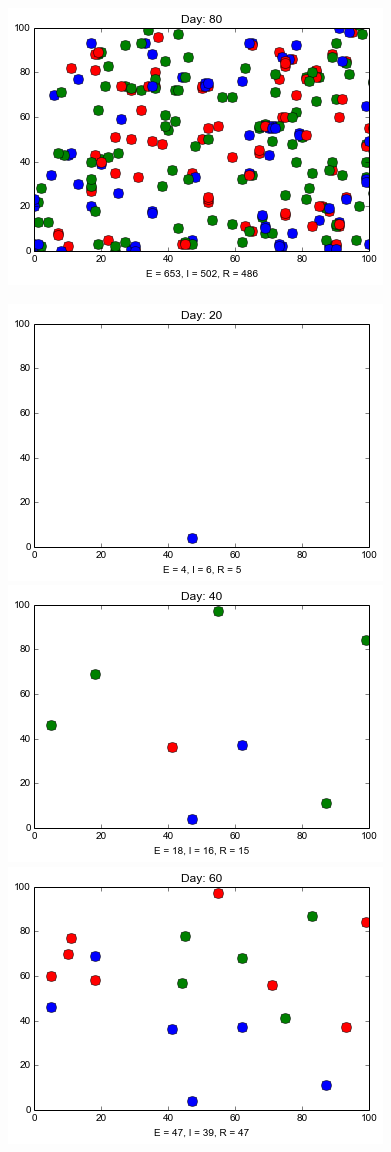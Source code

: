 \begin{figure}[h]
\includegraphics[scale=0.28]{images/3t80.png} 

\medskip
\includegraphics[scale=0.28]{images/2t20.png} \quad
\includegraphics[scale=0.28]{images/2t40.png} \quad
\includegraphics[scale=0.28]{images/2t60.png} \quad

\end{figure}
